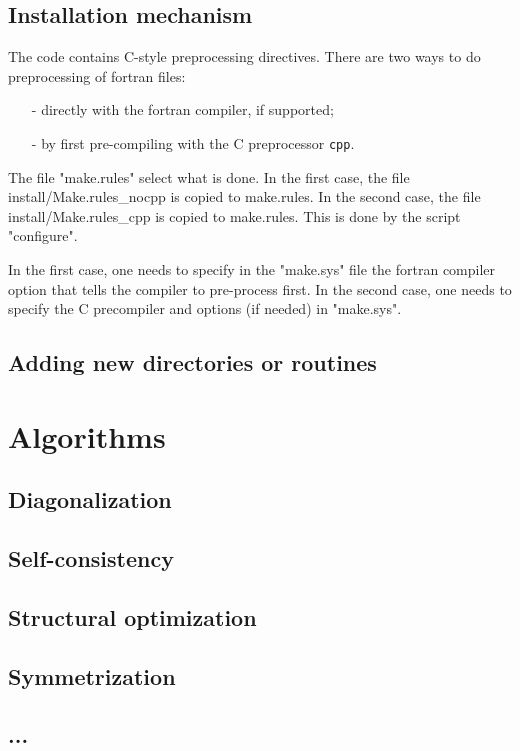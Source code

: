 \documentclass[12pt]{article}
\begin{document}
\subsection{Installation mechanism}

The code contains C-style preprocessing directives. 
There are two ways to do preprocessing of fortran files:
\begin{itemize}
\item[-] directly with the fortran compiler, if supported;
\item[-] by first pre-compiling with the C preprocessor {\tt cpp}.
\end{itemize}
The file "make.rules" select what is done.
In the first case,  the file install/Make.rules\_nocpp is copied
to make.rules.
In the second case, the file install/Make.rules\_cpp is 
copied to make.rules. This is done by the script "configure".

In the first case, one needs to specify in the "make.sys" file the
fortran compiler option that tells the compiler 
to pre-process first. In the second case, one needs to 
specify the C precompiler and options (if needed) in "make.sys".

\subsection{Adding new directories or routines}

\section{Algorithms}
\subsection{Diagonalization}
\subsection{Self-consistency}
\subsection{Structural optimization}
\subsection{Symmetrization}
\subsection{...}
\end{document}
